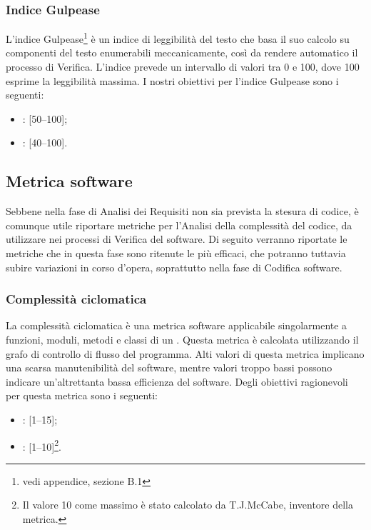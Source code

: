 \subsubsection{Indice Gulpease}
\label{4.1.1}
L'indice Gulpease\footnote{vedi appendice, sezione B.1} è un indice di leggibilità del testo che basa il suo calcolo su componenti del testo enumerabili meccanicamente, così da rendere automatico il processo di Verifica.
L'indice prevede un intervallo di valori tra 0 e 100, dove 100 esprime la leggibilità massima.
I nostri obiettivi per l'indice Gulpease sono i seguenti:
\begin{itemize}
\item {}: [50--100];
\item {}: [40--100].
\end{itemize}

\subsection{Metrica software}
\label{4.2}
Sebbene nella fase di Analisi dei Requisiti non sia prevista la stesura di codice, è comunque utile riportare metriche per l'Analisi della complessità del codice, da utilizzare nei processi di Verifica del software. Di seguito verranno riportate le metriche che in questa fase sono ritenute le più efficaci, che potranno tuttavia subire variazioni in corso d'opera, soprattutto nella fase di Codifica software.

\subsubsection{Complessità ciclomatica}
\label{4.2.1}
La complessità ciclomatica è una metrica software applicabile singolarmente a funzioni, moduli, metodi e classi di un .
Questa metrica è calcolata utilizzando il grafo di controllo di flusso del programma.
Alti valori di questa metrica implicano una scarsa manutenibilità del software, mentre valori troppo bassi possono indicare un'altrettanta bassa efficienza del software.
Degli obiettivi ragionevoli per questa metrica sono i seguenti:
\begin{itemize}
\item {}: [1--15];
\item {}: [1--10]\footnote{Il valore 10 come massimo è stato calcolato da T.J.McCabe, inventore della metrica.}.
\end{itemize}

